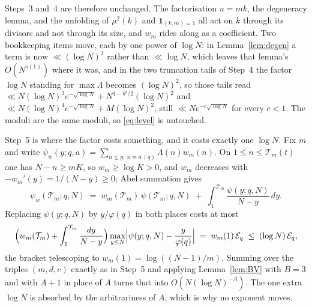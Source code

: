 \documentclass[11pt,a4paper]{article}
\theoremstyle{plain}
\theoremstyle{definition}
\theoremstyle{remark}
\newcommand{\Tcut}{\mathcal T}
\begin{document}
Steps~3 and~4 are therefore unchanged. The factorisation $u=mk$, the
degeneracy lemma, and the unfolding of $\mu^2(k)$ and
$\mathbf 1_{(k,m)=1}$ all act on $k$ through its divisors and not
through its size, and $w_m$ rides along as a coefficient. Two
bookkeeping items move, each by one power of $\log N$: in
Lemma~\ref{lem:degen} a term is now $\ll(\log N)^2$ rather than
$\ll\log N$, which leaves that lemma's $O(N^{o(1)})$ where it was, and
in the two truncation tails of Step~4 the factor $\log N$ standing for
$\max\Lambda$ becomes $(\log N)^2$, so those tails read
$\ll N(\log N)^{3}e^{-\sqrt{\log N}}+N^{1-\theta'/2}(\log N)^2$ and
$\ll N(\log N)^{4}e^{-\sqrt{\log N}}+M(\log N)^2$, still
$\ll Ne^{-c\sqrt{\log N}}$ for every $c<1$. The moduli are the same
moduli, so \eqref{eq:level} is untouched.

Step~5 is where the factor costs something, and it costs exactly one
$\log N$. Fix $m$ and write
$\psi_w(y;q,a)=\sum_{n\le y,\ n\equiv a\,(q)}\Lambda(n)w_m(n)$. On
$1\le n\le\Tcut_m(t)$ one has $N-n\ge mK$, so $w_m\ge\log K>0$, and
$w_m$ decreases with $-w_m'(y)=1/(N-y)\ge0$; Abel summation gives
\[
  \psi_w(\Tcut_m;q,N)
   \;=\;w_m(\Tcut_m)\,\psi(\Tcut_m;q,N)
     \;+\;\int_{1}^{\Tcut_m}\frac{\psi(y;q,N)}{N-y}\,dy .
\]
Replacing $\psi(y;q,N)$ by $y/\varphi(q)$ in both places costs at most
\[
  \Bigl(w_m(\Tcut_m)+\int_{1}^{\Tcut_m}\frac{dy}{N-y}\Bigr)
  \max_{y\le N}\Bigl|\psi(y;q,N)-\frac{y}{\varphi(q)}\Bigr|
  \;=\;w_m(1)\,\mathcal E_q\;\le\;(\log N)\,\mathcal E_q,
\]
the bracket telescoping to $w_m(1)=\log((N-1)/m)$. Summing over the
triples $(m,d,e)$ exactly as in Step~5 and applying
Lemma~\ref{lem:BV} with $B=3$ and with $A+1$ in place of $A$ turns
that into $O(N(\log N)^{-A})$. The one extra $\log N$ is absorbed by
the arbitrariness of $A$, which is why no exponent moves.
\end{document}
